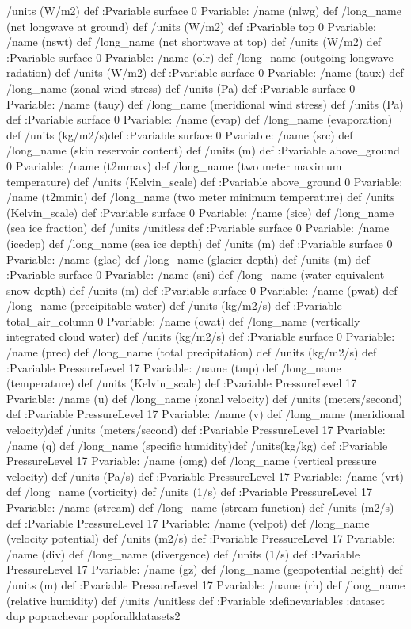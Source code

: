 \begin{ingrid}
/units (W/m2) def :Pvariable
surface 0 Pvariable: /name (nlwg) def /long_name (net longwave at ground) def 
/units (W/m2) def :Pvariable
top 0 Pvariable: /name (nswt) def /long_name (net shortwave at top) def 
/units (W/m2) def :Pvariable
surface 0 Pvariable: /name (olr) def /long_name (outgoing longwave radation) def 
/units (W/m2) def :Pvariable
surface 0 Pvariable: /name (taux) def /long_name (zonal wind stress) def
/units (Pa) def :Pvariable
surface 0 Pvariable: /name (tauy) def /long_name (meridional wind stress) def
/units (Pa) def :Pvariable
surface 0 Pvariable: /name (evap) def /long_name (evaporation) def
/units (kg/m2/s)def :Pvariable
surface 0 Pvariable: /name (src) def /long_name (skin reservoir content) def
/units (m) def :Pvariable
above_ground 0 Pvariable: /name (t2mmax) def /long_name (two meter maximum temperature) def  /units (Kelvin_scale) def :Pvariable
above_ground 0 Pvariable: /name (t2mmin) def /long_name (two meter minimum temperature) def  /units (Kelvin_scale) def :Pvariable
surface 0 Pvariable: /name (sice) def /long_name (sea ice fraction) def 
/units /unitless def :Pvariable
surface 0 Pvariable: /name (icedep) def /long_name (sea ice depth) def
/units (m) def :Pvariable
surface 0 Pvariable: /name (glac) def /long_name (glacier depth) def
/units (m) def  :Pvariable
surface 0 Pvariable: /name (sni) def /long_name (water equivalent snow depth) def
/units (m) def  :Pvariable
surface 0 Pvariable: /name (pwat) def /long_name (precipitable water) def
/units (kg/m2/s) def :Pvariable
total_air_column 0 Pvariable: /name (cwat) def /long_name (vertically integrated cloud water) def
/units (kg/m2/s) def :Pvariable
surface 0 Pvariable: /name (prec) def /long_name (total precipitation) def
/units (kg/m2/s) def :Pvariable
PressureLevel 17 Pvariable: /name (tmp) def /long_name (temperature) def  /units (Kelvin_scale) def :Pvariable
PressureLevel 17 Pvariable: /name (u) def /long_name (zonal velocity) def /units (meters/second) def :Pvariable
PressureLevel 17 Pvariable: /name (v) def /long_name (meridional velocity)def /units (meters/second) def :Pvariable
PressureLevel 17 Pvariable: /name (q) def /long_name (specific humidity)def /units(kg/kg) def :Pvariable
PressureLevel 17 Pvariable: /name (omg) def /long_name (vertical pressure velocity) def
/units (Pa/s) def :Pvariable
PressureLevel 17 Pvariable: /name (vrt) def /long_name (vorticity) def 
/units (1/s) def :Pvariable
PressureLevel 17 Pvariable: /name (stream) def /long_name (stream function) def
/units (m2/s) def :Pvariable
PressureLevel 17 Pvariable: /name (velpot) def /long_name (velocity potential) def 
/units (m2/s) def :Pvariable
PressureLevel 17 Pvariable: /name (div) def /long_name (divergence) def
/units (1/s) def :Pvariable
PressureLevel 17 Pvariable: /name (gz) def /long_name (geopotential height) def 
/units (m) def :Pvariable
PressureLevel 17 Pvariable: /name (rh) def /long_name (relative humidity) def 
/units /unitless def :Pvariable
:definevariables
:dataset
dup {pop}{cachevar pop}foralldatasets2
\end{ingrid}
